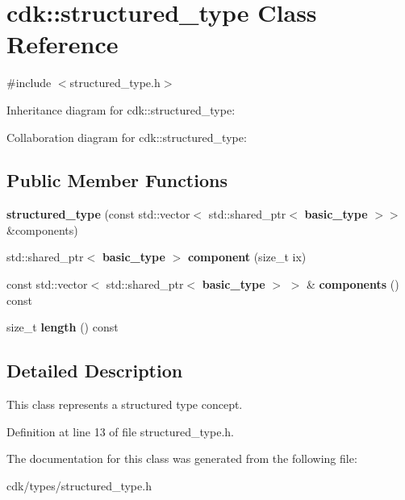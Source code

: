 \section{cdk\+:\+:structured\+\_\+type Class Reference}
\label{classcdk_1_1structured__type}


{\ttfamily \#include $<$structured\+\_\+type.\+h$>$}



Inheritance diagram for cdk\+:\+:structured\+\_\+type\+:


Collaboration diagram for cdk\+:\+:structured\+\_\+type\+:
\subsection*{Public Member Functions}
\begin{DoxyCompactItemize}
\item 
\mbox{\label{classcdk_1_1structured__type_a41d408915b1d1aabd0c1b713bfb3edab}} 
{\bfseries structured\+\_\+type} (const std\+::vector$<$ std\+::shared\+\_\+ptr$<$ \textbf{ basic\+\_\+type} $>$$>$ \&components)
\item 
\mbox{\label{classcdk_1_1structured__type_a93594e1b3846a8efa53a2c976e39342e}} 
std\+::shared\+\_\+ptr$<$ \textbf{ basic\+\_\+type} $>$ {\bfseries component} (size\+\_\+t ix)
\item 
\mbox{\label{classcdk_1_1structured__type_a30e73634d7995df6f8f4b28b42357c94}} 
const std\+::vector$<$ std\+::shared\+\_\+ptr$<$ \textbf{ basic\+\_\+type} $>$ $>$ \& {\bfseries components} () const
\item 
\mbox{\label{classcdk_1_1structured__type_a95cef3188c6480326b9e31e35d3d22b7}} 
size\+\_\+t {\bfseries length} () const
\end{DoxyCompactItemize}


\subsection{Detailed Description}
This class represents a structured type concept. 

Definition at line 13 of file structured\+\_\+type.\+h.



The documentation for this class was generated from the following file\+:\begin{DoxyCompactItemize}
\item 
cdk/types/structured\+\_\+type.\+h\end{DoxyCompactItemize}
